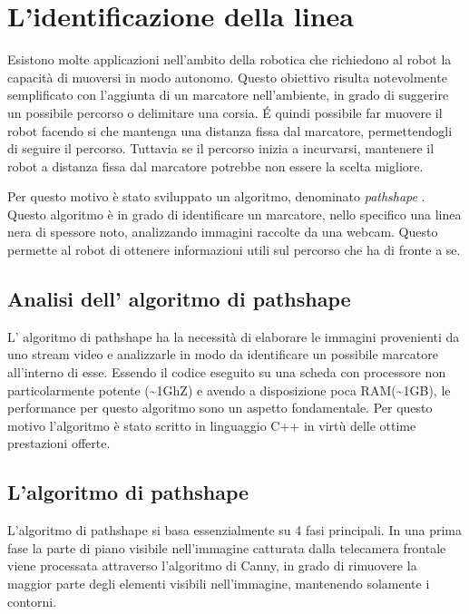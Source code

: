 \chapter{L'identificazione della linea}

	Esistono molte applicazioni nell'ambito della robotica che richiedono al robot la capacità di muoversi in modo autonomo. Questo obiettivo risulta notevolmente semplificato con l'aggiunta di un marcatore nell'ambiente, in grado di suggerire un possibile percorso o delimitare una corsia. \'E quindi possibile far muovere il robot facendo si che mantenga una distanza fissa dal marcatore, permettendogli di seguire il percorso.
	Tuttavia se il percorso inizia a incurvarsi, mantenere il robot a distanza fissa dal marcatore potrebbe non essere la scelta migliore.

	Per questo motivo è stato sviluppato un algoritmo, denominato \textit{pathshape} \cite{pathshape}. Questo algoritmo è in grado di identificare un marcatore, nello specifico una linea nera di spessore noto, analizzando immagini raccolte da una webcam. Questo permette al robot di ottenere informazioni utili sul percorso che ha di fronte a se.

\section{Analisi dell' algoritmo di pathshape}

	L' algoritmo di pathshape ha la necessità di elaborare le immagini provenienti da uno stream video e analizzarle in modo da identificare un possibile marcatore all'interno di esse. Essendo il codice eseguito su una scheda con processore non particolarmente potente (\textasciitilde1GhZ) e avendo a disposizione poca RAM(\textasciitilde1GB), le performance per questo algoritmo sono un aspetto fondamentale. Per questo motivo l'algoritmo è stato scritto in linguaggio C++ in virtù delle ottime prestazioni offerte.

\section{L'algoritmo di pathshape}

	L'algoritmo di pathshape si basa essenzialmente su 4 fasi principali.
	In una prima fase la parte di piano visibile nell'immagine catturata dalla telecamera frontale viene processata attraverso l'algoritmo di Canny\cite{canny}, in grado di rimuovere la maggior parte degli elementi visibili nell'immagine, mantenendo solamente i contorni.

